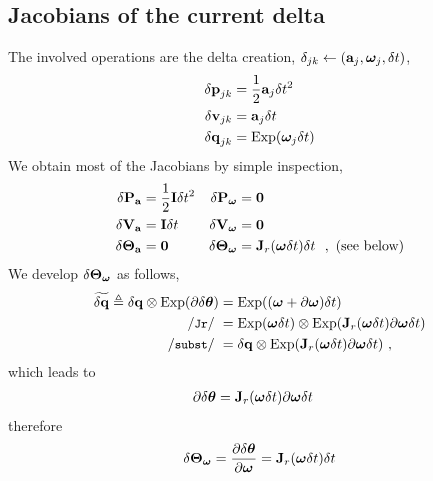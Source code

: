 \subsection{Jacobians of the current delta}%
\label{sec:jac_data}

%
%
%
The involved operations are the delta creation, $\delta_{jk} \gets ({\bf a}_j,{{\bm \omega}}_j,\delta t)$,
%
\begin{align*}
\begin{split}
{\delta{\bf p}}_{jk} &= \frac12{\bf a}_j\delta t^2 \\
{\delta{\bf v}}_{jk} &= {\bf a}_j\delta t \\
{\delta{\bf q}}_{jk} &= \operatorname*{Exp}({{\bm \omega}}_j\delta t)
\end{split}
\end{align*}
%
We obtain most of the Jacobians by simple inspection,
%
\begin{align*}
{\delta{\bf P}}_{\bf a} &= \frac12{\bf I}\delta t^2 	& {\delta{\bf P}}_{{\bm \omega}} &= \bf0 \\
{\delta{\bf V}}_{\bf a} &= {\bf I}\delta t 			& {\delta{\bf V}}_{{\bm \omega}} &= \bf0 \\
{\delta{\bm \Theta}}_{\bf a} &= \bf0 				& {\delta{\bm \Theta}}_{{\bm \omega}} &= {\bf J}_r({{\bm \omega}}\delta t)\delta t ~~,\textrm{ (see below)} 
\end{align*}
%
We develop ${\delta{\bm \Theta}}_{{\bm \omega}}$ as follows,
%
\begin{align*}
\widetilde\dq \te \dq\ot\Exp(\partial\dth) 
&= \Exp((\bw+\partial\bw)\dt) \\
\cJr &= \Exp(\bw\dt)\ot\Exp(\bfJ_r(\bw\dt)\partial\bw\dt) \\
\csubst &= \dq \ot \Exp(\bfJ_r(\bw\dt)\partial\bw\dt)
~,
\end{align*}
%
which leads to
%
\begin{align*}
\partial{\delta{{\bm \theta}}} &= {\bf J}_r({{\bm \omega}}\delta t)\partial{{\bm \omega}}\delta t
\end{align*}
%
therefore
%
\begin{align}
{\delta{\bm \Theta}}_{{\bm \omega}} = \frac{\partial{\delta{{\bm \theta}}}}{\partial{{\bm \omega}}} = {\bf J}_r({{\bm \omega}}\delta t)\delta t
\end{align}

